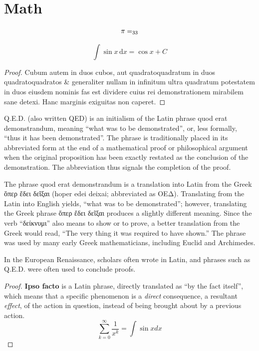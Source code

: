 \documentclass[twoside]{fduthesis-2026-en}
\begin{document}
\section{Math}

\[\pi=\sb{33}\]

\[
  \int\sin x\,\mathrm{d}x=\cos x + C
\]

\begin{proof}
Cubum autem in duos cubos, aut quadratoquadratum in duos quadratoquadratos
\& generaliter nullam in infinitum ultra quadratum potestatem in duos eiusdem
nominis fas est dividere cuius rei demonstrationem mirabilem sane detexi.
Hanc marginis exiguitas non caperet.
\end{proof}

\begin{definition}
Q.E.D. (also written QED) is an initialism of the Latin phrase quod erat
demonstrandum, meaning ``what was to be demonstrated'', or, less formally,
``thus it has been demonstrated''. The phrase is traditionally placed in
its abbreviated form at the end of a mathematical proof or philosophical
argument when the original proposition has been exactly restated as the
conclusion of the demonstration. The abbreviation thus signals the completion
of the proof.

The phrase quod erat demonstrandum is a translation into Latin from the
Greek ὅπερ ἔδει δεῖξαι (hoper edei deixai; abbreviated as ΟΕΔ). Translating
from the Latin into English yields, ``what was to be demonstrated''; however,
translating the Greek phrase ὅπερ ἔδει δεῖξαι produces a slightly different
meaning. Since the verb ``δείκνυμι'' also means to show or to prove, a
better translation from the Greek would read, ``The very thing it was required
to have shown.'' The phrase was used by many early Greek mathematicians,
including Euclid and Archimedes.
\end{definition}

\begin{lemma}
In the European Renaissance, scholars often wrote in Latin, and phrases
such as Q.E.D. were often used to conclude proofs.
\end{lemma}

\begin{proof}
\textbf{Ipso facto} is a Latin phrase, directly translated as ``by the fact itself'',
which means that a specific phenomenon is a \emph{direct} consequence, a
resultant \textit{effect}, of the action in question, instead of being brought
about by a previous action.
\begin{equation}
  \sum_{k=0}^{\infty} \frac{1}{x^k} = \int \sin x dx
\end{equation}
\end{proof}
\end{document}
